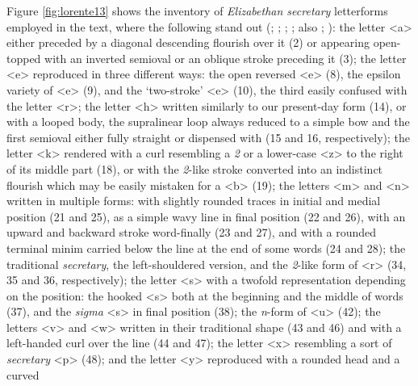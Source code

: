 \documentclass{article}
\begin{document}
Figure \ref{fig:lorente13} shows the inventory of \emph{Elizabethan secretary}
letterforms employed in the text, where the following stand out (\cite[202--205]{byrne_elizabethan_1925}; \cite[27--91]{tannenbaum_handwriting_1930}; \cite[13--16]{dawson_elizabethan_1966}; \cite[17]{petti_english_1977}; also \cite{preston_english_1999}; \cite{beal_dictionary_2008}): the
letter \textless a\textgreater{} either preceded by a diagonal
descending flourish over it (2) or appearing open-topped with an
inverted semioval or an oblique stroke preceding it (3); the letter
\textless e\textgreater{} reproduced in three different ways: the open
reversed \textless e\textgreater{} (8), the epsilon variety of
\textless e\textgreater{} (9), and the `two-stroke'
\textless e\textgreater{} (10), the third easily confused with the
letter \textless r\textgreater; the letter \textless h\textgreater{}
written similarly to our present-day form (14), or with a looped body,
the supralinear loop always reduced to a simple bow and the first
semioval either fully straight or dispensed with (15 and 16,
respectively); the letter \textless k\textgreater{} rendered with a curl
resembling a \emph{2} or a lower-case \textless z\textgreater{} to the
right of its middle part (18), or with the \emph{2}-like stroke
converted into an indistinct flourish which may be easily mistaken for a
\textless b\textgreater{} (19); the letters \textless m\textgreater{}
and \textless n\textgreater{} written in multiple forms: with slightly
rounded traces in initial and medial position (21 and 25), as a simple
wavy line in final position (22 and 26), with an upward and backward
stroke word-finally (23 and 27), and with a rounded terminal minim
carried below the line at the end of some words (24 and 28); the
traditional \emph{secretary}, the left-shouldered version, and the
\emph{2}-like form of \textless r\textgreater{} (34, 35 and 36,
respectively); the letter \textless s\textgreater{} with a twofold
representation depending on the position: the hooked
\textless s\textgreater{} both at the beginning and the middle of words
(37), and the \emph{sigma} \textless s\textgreater{} in final position
(38); the \emph{n}-form of \textless u\textgreater{} (42); the letters
\textless v\textgreater{} and \textless w\textgreater{} written in their
traditional shape (43 and 46) and with a left-handed curl over the line
(44 and 47); the letter \textless x\textgreater{} resembling a sort of
\emph{secretary} \textless p\textgreater{} (48); and the letter
\textless y\textgreater{} reproduced with a rounded head and a curved
\end{document}
